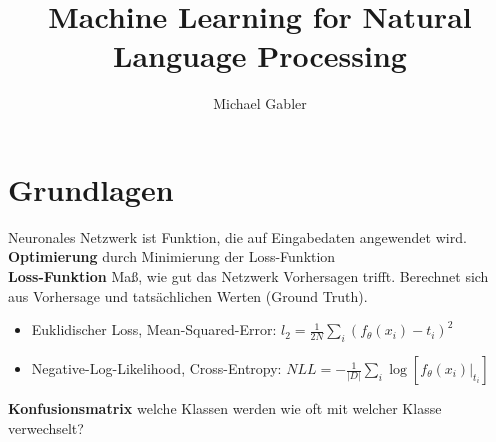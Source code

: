 \documentclass[12pt]{article}
\begin{document}
	\title{Machine Learning for Natural Language Processing}
	\author{Michael Gabler}
	\maketitle
	\tableofcontents
	\newpage

	\section{Grundlagen}
	Neuronales Netzwerk ist Funktion, die auf Eingabedaten angewendet wird.\\
	\textbf{Optimierung} durch Minimierung der Loss-Funktion\\
	\textbf{Loss-Funktion} Maß, wie gut das Netzwerk Vorhersagen trifft. Berechnet sich aus Vorhersage und tatsächlichen Werten (Ground Truth).
	\begin{itemize}
		\item Euklidischer Loss, Mean-Squared-Error: $l_2 = \frac{1}{2N} \sum_i (f_\theta(x_i)-t_i)^2$
		\item Negative-Log-Likelihood, Cross-Entropy: $NLL = -\frac{1}{|D|}\sum_i \log[f_\theta(x_i)|_{t_i}]$
	\end{itemize}
	\textbf{Konfusionsmatrix} welche Klassen werden wie oft mit welcher Klasse verwechselt?\\
	
\end{document}
